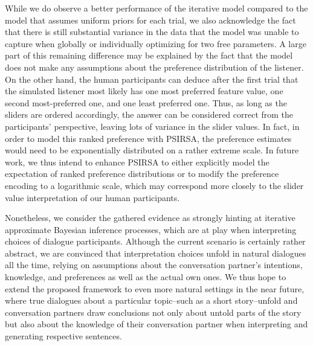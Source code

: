 \documentclass[10pt,a4paper]{article}
\begin{document}
While we do observe a better performance of the iterative model compared to the model that assumes uniform priors for each trial, we also acknowledge the fact that there is still substantial variance in the data that the model was unable to capture when globally or individually optimizing for two free parameters. 
A large part of this remaining difference may be explained by the fact that the model does not make any assumptions about the preference distribution of the listener. 
On the other hand, the human participants can deduce after the first trial that the simulated listener most likely has one most preferred feature value, one second most-preferred one, and one least preferred one. 
Thus, as long as the sliders are ordered accordingly, the answer can be considered correct from the participants' perspective, leaving lots of variance in the slider values. 
In fact, in order to model this ranked preference with PSIRSA, the preference estimates would need to be exponentially distributed on a rather extreme scale.
In future work, we thus intend to enhance PSIRSA to either explicitly model the expectation of ranked preference distributions or to modify the preference encoding to a logarithmic scale, which may correspond more closely to the slider value interpretation of our human participants. 

Nonetheless, we consider the gathered evidence as strongly hinting at iterative approximate Bayesian inference processes, which are at play when interpreting choices of dialogue participants. 
Although the current scenario is certainly rather abstract, we are convinced that interpretation choices unfold in natural dialogues all the time, relying on assumptions about the conversation partner's intentions, knowledge, and preferences as well as the actual own ones. 
We thus hope to extend the proposed framework to even more natural settings in the near future, where true dialogues about a particular topic--such as a short story--unfold and conversation partners draw conclusions not only about untold parts of the story but also about the knowledge of their conversation partner when interpreting and generating respective sentences.
\end{document}
